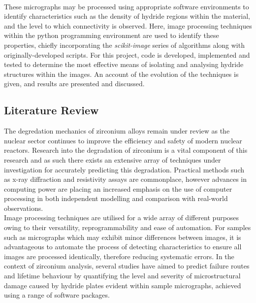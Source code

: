 \documentclass{article}
\begin{document}
	\\
	These micrographs may be processed using appropriate software environments to identify characteristics such as the density of hydride regions within the material, and the level to which connectivity is observed. Here, image processing techniques within the python programming environment are used to identify these properties, chiefly incorporating the \textit{scikit-image} series of algorithms along with originally-developed scripts. For this project, code is developed, implemented and tested to determine the most effective means of isolating and analysing hydride structures within the images. An account of the evolution of the techniques is given, and results are presented and discussed.
	\\
	\subsection{Literature Review}
	The degredation mechanics of zirconium alloys remain under review as the nuclear sector continues to improve the efficiency and safety of modern nuclear reactors. Research into the degradation of zirconium is a vital component of this research and as such there exists an extensive array of techniques under investigation for accurately predicting this degradation. Practical methods such as x-ray diffraction and resistivity assays are commonplace, however advances in computing power are placing an increased emphasis on the use of computer processing in both independent modelling and comparison with real-world observations.
	\\
	Image processing techniques are utilised for a wide array of different purposes owing to their versatility, reprogrammability and ease of automation. For samples such as micrographs which may exhibit minor differences between images, it is advantageous to automate the process of detecting characteristics to ensure all images are processed identically, therefore reducing systematic errors. In the context of zirconium analysis, several studies have aimed to predict failure routes and lifetime behaviour by quantifying the level and severity of microstructural damage caused by hydride plates evident within sample micrographs, achieved using a range of software packages.
	\\
	\\
\end{document}
